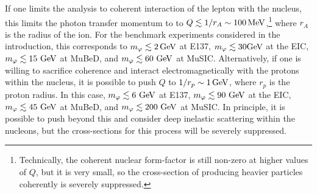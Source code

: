 If one limits the analysis to coherent interaction of the lepton with the nucleus, this limits the photon transfer momentum to to $Q \lesssim 1/r_{A} \sim 100\,{\rm MeV}$,\footnote{Technically, the coherent nuclear form-factor is still non-zero at higher values of $Q$, but it is very small, so the cross-section of producing heavier particles coherently is severely suppressed.} where $r_A$ is the radius of the ion. For the benchmark experiments considered in the introduction, this corresponds to $m_\varphi \lesssim 2\,{\rm GeV}$ at E137, $m_\varphi \lesssim {30\rm GeV}$ at the EIC, $m_\varphi \lesssim 15~{\rm GeV}$ at MuBeD, and $m_\varphi \lesssim 60~{\rm GeV}$ at MuSIC. Alternatively, if one is willing to sacrifice coherence and interact electromagnetically with the protons within the nucleus, it is possible to push $Q$ to $1/r_p \sim 1\,{\rm GeV}$, where $r_p$ is the proton radius. In this case, $m_\varphi \lesssim 6~{\rm GeV}$ at E137, $m_\varphi \lesssim 90~{\rm GeV}$ at the EIC, $m_\varphi \lesssim 45~{\rm GeV}$ at MuBeD, and $m_\varphi \lesssim 200~{\rm GeV}$ at MuSIC. In principle, it is possible to push beyond this and consider deep inelastic scattering within the nucleons, but the cross-sections for this process will be severely suppressed.

